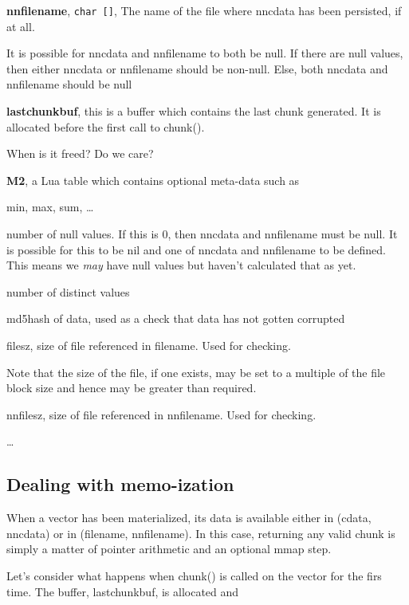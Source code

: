 \item {\bf nnfilename}, \verb+char []+, The name of the file where nncdata has been
persisted, if at all. 

It is possible for nncdata and nnfilename to both be null.
If there are null values, then either nncdata or nnfilename should be non-null.  Else, both nncdata and nnfilename should be null
\item {\bf lastchunkbuf}, this is a buffer which contains the last chunk
generated. It is allocated before the first call to chunk(). 

When is it freed? Do we care? 
\ee
\item {\bf M2}, a Lua table which contains optional meta-data such as 
\be
\item min, max, sum, \ldots
\item number of null values. If this is 0, then nncdata and nnfilename must be
null. It is possible for this to be nil and one of nncdata and nnfilename to be
defined. This means we {\em may} have null values but haven't calculated that as
yet. 
\item number of distinct values
\item md5hash of data, used as a check that data has not gotten corrupted
\item filesz, size of file referenced in filename. Used for checking.

Note that the size of the file, if one exists, may be set to a
multiple of the file block size and hence may be greater than
required.
\item nnfilesz, size of file referenced in nnfilename. Used for checking.
\item \ldots
\ee

\ee

\subsection{Dealing with memo-ization}

When a vector has been materialized, its data is available either in (cdata,
nncdata) or in (filename, nnfilename). In this case, returning any valid chunk
is simply a matter of pointer arithmetic and an optional mmap step.

Let's consider what happens when chunk() is called on the vector for the firs
time. The buffer, lastchunkbuf, is allocated and 

